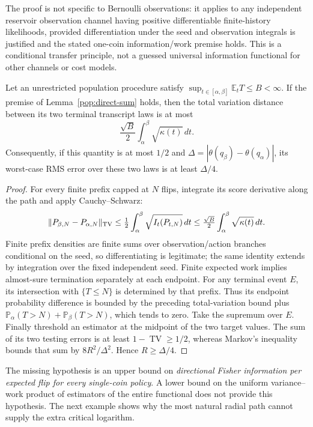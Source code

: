 The proof is not specific to Bernoulli observations: it applies to any
independent reservoir observation channel having positive differentiable
finite-history likelihoods, provided differentiation under the seed and
observation integrals is justified and the stated one-coin information/work
premise holds. This is a conditional transfer principle, not a guessed
universal information functional for other channels or cost models.

\begin{corollary}
\label{pop:testing}
Let an unrestricted population procedure satisfy
$\sup_{t\in[\alpha,\beta]}\mathbb E_tT\le B<\infty$.
If the premise of Lemma~\ref{pop:direct-sum} holds, then the total variation
distance between its two terminal transcript laws is at most
\[
 \frac{\sqrt B}{2}\int_\alpha^\beta\sqrt{\kappa(t)}\,dt.
\]
Consequently, if this quantity is at most $1/2$ and
$\Delta=|\theta(q_\beta)-\theta(q_\alpha)|$, its worst-case RMS error
over these two laws is at least $\Delta/4$.
\end{corollary}
\begin{proof}
For every finite prefix capped at $N$ flips, integrate its score derivative
along the path and apply Cauchy--Schwarz:
\[
 \|P_{\beta,N}-P_{\alpha,N}\|_{\rm TV}
 \le\tfrac12\int_\alpha^\beta\sqrt{I_t(P_{t,N})}\,dt
 \le\tfrac{\sqrt B}{2}\int_\alpha^\beta\sqrt{\kappa(t)}\,dt.
\]
Finite prefix densities are finite sums over observation/action branches
conditional on the seed, so differentiating is legitimate; the same
identity extends by integration over the fixed independent seed.
Finite expected work implies almost-sure termination separately at each
endpoint. For any terminal event $E$, its intersection with $\{T\le N\}$
is determined by that prefix. Thus its endpoint probability difference
is bounded by the preceding total-variation bound plus
$\mathbb P_\alpha(T>N)+\mathbb P_\beta(T>N)$, which tends to zero.
Take the supremum over $E$. Finally threshold an estimator at the midpoint
of the two target values. The sum of its two testing errors is at least
$1-\operatorname{TV}\ge1/2$, whereas Markov's inequality bounds that
sum by $8R^2/\Delta^2$. Hence $R\ge\Delta/4$.
\end{proof}

The missing hypothesis is an upper bound on \emph{directional Fisher
information per expected flip for every single-coin policy}. A lower bound
on the uniform variance--work product of estimators of the entire
functional does not provide this hypothesis. The next example shows why
the most natural radial path cannot supply the extra critical logarithm.

